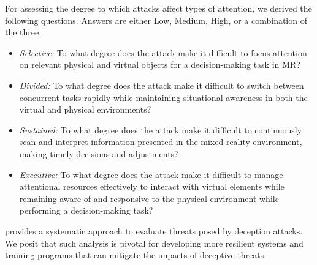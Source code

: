 For assessing the degree to which attacks affect types of attention, we derived the following questions. Answers are either Low, Medium, High, or a combination of the three.
\begin{itemize}
\itemsep0em
    \item \emph{Selective:} To what degree does the attack make it difficult to focus attention on relevant physical and virtual objects for a decision-making task in MR?
    \item \emph{Divided:} To what degree does the attack make it difficult to switch between concurrent tasks rapidly while maintaining situational awareness in both the virtual and physical environments?
    \item \emph{Sustained:} To what degree does the attack make it difficult to continuously scan and interpret information presented in the mixed reality environment, making timely decisions and adjustments?
    \item \emph{Executive:} To what degree does the attack make it difficult to manage attentional resources effectively to interact with virtual elements while remaining aware of and responsive to the physical environment while performing a decision-making task?    
\end{itemize}

\DAF provides a systematic approach to evaluate threats posed by \minoraddition{\MR} deception attacks. We posit that such analysis is pivotal for developing more resilient \MR systems and training programs that can mitigate the impacts of deceptive threats. 





